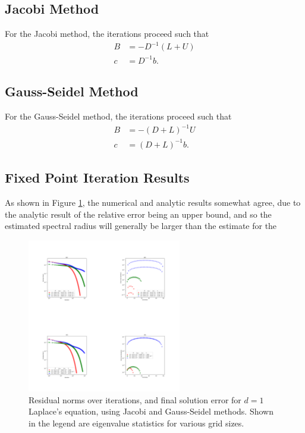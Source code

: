 \documentclass[12pt,letterpaper]{article}
\begin{document}
\subsection{Jacobi Method}
For the Jacobi method, the iterations proceed such that
\begin{align}
  B &= -D^{-1}(L+U) \\
  c &= D^{-1}b.
\end{align}



\subsection{Gauss-Seidel Method}
For the Gauss-Seidel method, the iterations proceed such that
\begin{align}
  B &= -(D+L)^{-1}U \\
  c &= (D+L)^{-1}b.
\end{align}


\subsection{Fixed Point Iteration Results}
As shown in Figure \ref{fig:FixedPt}, the numerical and analytic results somewhat agree, due to the analytic result of the relative error being an upper bound, and so the estimated spectral radius will generally be larger than the estimate for the 


\begin{figure}[ht]
  \centering
  \includegraphics[width=0.6\textwidth,trim={0 0 0 6cm},clip]{Ex1.pdf}
  \caption{Residual norms over iterations, and final solution error for $d=1$ Laplace's equation, using Jacobi and Gauss-Seidel methods. Shown in the legend are eigenvalue statistics for various grid sizes.}
  \label{fig:FixedPt}
\end{figure}

% 
% 
\end{document}
